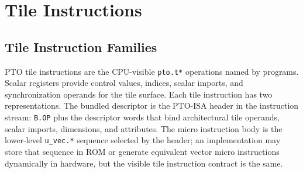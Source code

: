 \chapter{Tile Instructions}
\label{chap:tile-instructions}
\section{Tile Instruction Families}
PTO tile instructions are the CPU-visible \texttt{pto.t*} operations named by programs. Scalar registers provide control values, indices, scalar imports, and synchronization operands for the tile surface. Each tile instruction has two representations. The bundled descriptor is the PTO-ISA header in the instruction stream: \texttt{B.OP} plus the descriptor words that bind architectural tile operands, scalar imports, dimensions, and attributes. The micro instruction body is the lower-level \texttt{u\_vec.*} sequence selected by the header; an implementation may store that sequence in ROM or generate equivalent vector micro instructions dynamically in hardware, but the visible tile instruction contract is the same.

